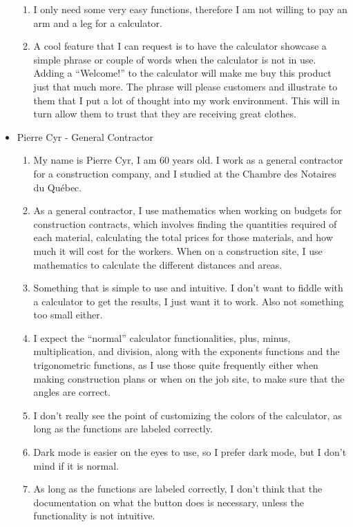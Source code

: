 \documentclass[titlepage]{article}
\begin{document}
\begin{itemize}
\begin{enumerate}
                        \item I only need some very easy functions, therefore I am not willing to pay an arm and a leg for a calculator.
                        \item A cool feature that I can request is to have the calculator showcase a simple phrase or couple of words when the calculator is not in use. Adding a “Welcome!” to the calculator will make me buy this product just that much more. The phrase will please customers and illustrate to them that I put a lot of thought into my work environment. This will in turn allow them to trust that they are receiving great clothes.
                    \end{enumerate}
                \item Pierre Cyr - General Contractor
                    \begin{enumerate}
                        \item My name is Pierre Cyr, I am 60 years old. I work as a general contractor for a construction company, and I studied at the Chambre des Notaires du Québec.
                        \item As a general contractor, I use mathematics when working on budgets for construction contracts, which involves finding the quantities required of each material, calculating the total prices for those materials, and how much it will cost for the workers. When on a construction site, I use mathematics to calculate the different distances and areas.
                        \item Something that is simple to use and intuitive. I don’t want to fiddle with a calculator to get the results, I just want it to work. Also not something too small either.
                        \item I expect the “normal” calculator functionalities, plus, minus, multiplication, and division, along with the exponents functions and the trigonometric functions, as I use those quite frequently either when making construction plans or when on the job site, to make sure that the angles are correct.
                        \item I don’t really see the point of customizing the colors of the calculator, as long as the functions are labeled correctly.
                        \item Dark mode is easier on the eyes to use, so I prefer dark mode, but I don’t mind if it is normal.
                        \item As long as the functions are labeled correctly, I don’t think that the documentation on what the button does is necessary, unless the functionality is not intuitive.

\end{enumerate}
\end{itemize}
\end{document}
